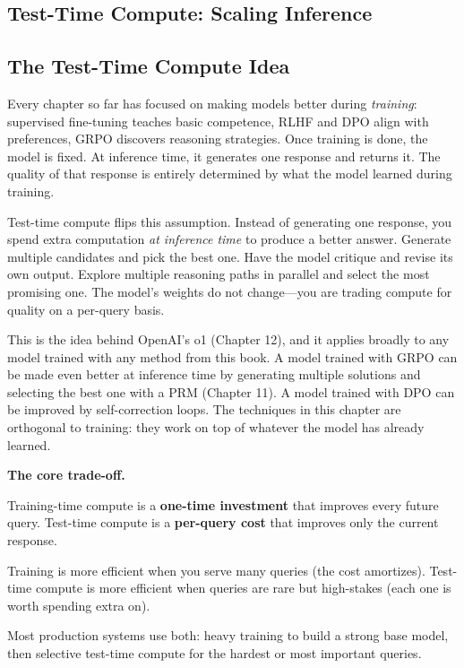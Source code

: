 \begin{chapterenv}

\chapter{Test-Time Compute: Scaling Inference}

\section{The Test-Time Compute Idea}

Every chapter so far has focused on making models better during \textit{training}: supervised fine-tuning teaches basic competence, RLHF and DPO align with preferences, GRPO discovers reasoning strategies. Once training is done, the model is fixed. At inference time, it generates one response and returns it. The quality of that response is entirely determined by what the model learned during training.

Test-time compute flips this assumption. Instead of generating one response, you spend extra computation \textit{at inference time} to produce a better answer. Generate multiple candidates and pick the best one. Have the model critique and revise its own output. Explore multiple reasoning paths in parallel and select the most promising one. The model's weights do not change---you are trading compute for quality on a per-query basis.

This is the idea behind OpenAI's o1 (Chapter 12), and it applies broadly to any model trained with any method from this book. A model trained with GRPO can be made even better at inference time by generating multiple solutions and selecting the best one with a PRM (Chapter 11). A model trained with DPO can be improved by self-correction loops. The techniques in this chapter are orthogonal to training: they work on top of whatever the model has already learned.

\begin{infobox}
\textbf{The core trade-off.}

Training-time compute is a \textbf{one-time investment} that improves every future query. Test-time compute is a \textbf{per-query cost} that improves only the current response.

Training is more efficient when you serve many queries (the cost amortizes). Test-time compute is more efficient when queries are rare but high-stakes (each one is worth spending extra on).

Most production systems use both: heavy training to build a strong base model, then selective test-time compute for the hardest or most important queries.
\end{infobox}


\end{chapterenv}
